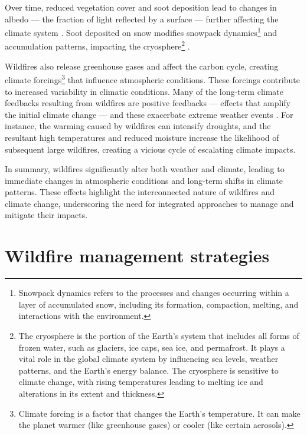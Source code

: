 \documentclass[
  12 pt,
]{Nemilov}
\begin{document}
Over time, reduced vegetation cover and soot deposition lead to changes in albedo --- the fraction of light reflected by a surface --- further affecting the climate system \citep{gatebe2014surface}. Soot deposited on snow modifies snowpack dynamics\footnote{Snowpack dynamics refers to the processes and changes occurring within a layer of accumulated snow, including its formation, compaction, melting, and interactions with the environment.} and accumulation patterns, impacting the cryosphere\footnote{The cryosphere is the portion of the Earth's system that includes all forms of frozen water, such as glaciers, ice caps, sea ice, and permafrost. It plays a vital role in the global climate system by influencing sea levels, weather patterns, and the Earth's energy balance. The cryosphere is sensitive to climate change, with rising temperatures leading to melting ice and alterations in its extent and thickness.} \citep{awadhiya2021principles, aubry2022fire}.

Wildfires also release greenhouse gases and affect the carbon cycle, creating climate forcings\footnote{Climate forcing is a factor that changes the Earth's temperature. It can make the planet warmer (like greenhouse gases) or cooler (like certain aerosols).} that influence atmospheric conditions. These forcings contribute to increased variability in climatic conditions. Many of the long-term climate feedbacks resulting from wildfires are positive feedbacks --- effects that amplify the initial climate change --- and these exacerbate extreme weather events \citep{halofsky2020changing, mckenzie2004climatic, richardson2022global, westerling2008climate}. For instance, the warming caused by wildfires can intensify droughts, and the resultant high temperatures and reduced moisture increase the likelihood of subsequent large wildfires, creating a vicious cycle of escalating climate impacts.

In summary, wildfires significantly alter both weather and climate, leading to immediate changes in atmospheric conditions and long-term shifts in climate patterns. These effects highlight the interconnected nature of wildfires and climate change, underscoring the need for integrated approaches to manage and mitigate their impacts.

\part{Wildfire management strategies}\label{part-wildfire-management-strategies}
\end{document}

